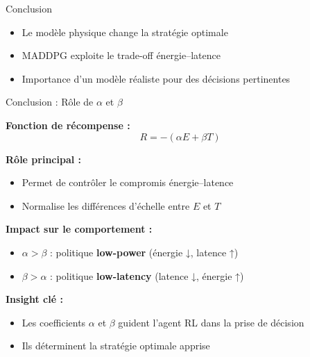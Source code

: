 \documentclass{beamer}
\begin{document}
\begin{frame}{Conclusion}

\begin{itemize}
\item Le modèle physique change la stratégie optimale
\item MADDPG exploite le trade-off énergie–latence
\item Importance d’un modèle réaliste pour des décisions pertinentes
\end{itemize}

\end{frame}

\begin{frame}{Conclusion : Rôle de $\alpha$ et $\beta$}

\textbf{Fonction de récompense :}
\begin{equation}
R = -(\alpha E + \beta T)
\end{equation}

\textbf{Rôle principal :}
\begin{itemize}
\item Permet de contrôler le compromis énergie--latence
\item Normalise les différences d’échelle entre $E$ et $T$
\end{itemize}

\textbf{Impact sur le comportement :}
\begin{itemize}
\item $\alpha > \beta$ : politique \textbf{low-power} (énergie ↓, latence ↑)
\item $\beta > \alpha$ : politique \textbf{low-latency} (latence ↓, énergie ↑)
\end{itemize}

\textbf{Insight clé :}
\begin{itemize}
\item Les coefficients $\alpha$ et $\beta$ guident l’agent RL dans la prise de décision
\item Ils déterminent la stratégie optimale apprise
\end{itemize}

\end{frame}
\end{document}
